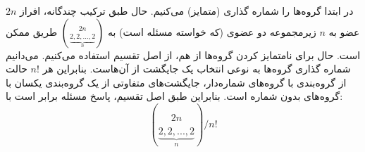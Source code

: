 \p
در ابتدا گروه‌ها را شماره گذاری
(متمایز)
می‌کنیم.
حال طبق ترکیب چندگانه، افراز
$2n$
عضو به
$n$
زیرمجموعه دو عضوی (که خواسته مسئله است) به
${2n \choose \underbrace{2,2,...,2}_n}$
طریق ممکن است.
حال برای نامتمایز کردن گروه‌ها از هم، از اصل تقسیم استفاده می‌کنیم.
می‌دانیم شماره گذاری گروه‌ها به نوعی انتخاب یک جایگشت از آن‌هاست.
بنابراین هر
$n!$
حالت از گروه‌بندی با گروه‌های شماره‌دار، جایگشت‌های متفاوتی از
یک گروه‌بندی یکسان با گروه‌های بدون شماره است.
بنابراین طبق اصل تقسیم، پاسخ مسئله برابر است با:
$${2n \choose \underbrace{2,2,...,2}_n}/n!$$
